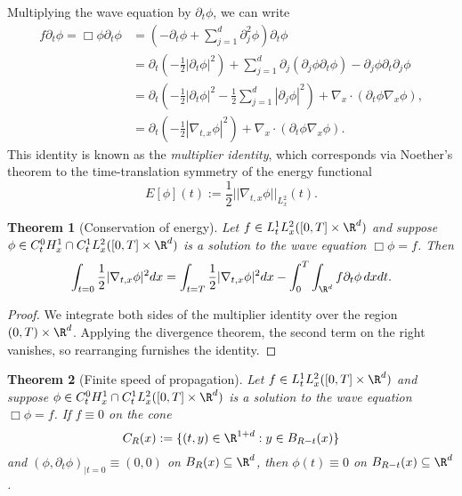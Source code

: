 \documentclass[reqno]{amsart}
\newtheorem{theorem}{Theorem}
\theoremstyle{definition}
\theoremstyle{remark}
\begin{document}
Multiplying the wave equation by $\partial_t \phi$, we can write
\begin{align*}
			f \partial_t \phi = \Box \phi \partial_t \phi
				&= \left( - \partial_t \phi + \sum_{j = 1}^d \partial_j^2 \phi \right) \partial_t \phi \\
				&= \partial_t \left( -\frac12 |\partial_t \phi|^2 \right) + \sum_{j = 1}^d \partial_j (\partial_j \phi \partial_t \phi) - \partial_j \phi \partial_t \partial_j \phi \\
				&= \partial_t \left( -\frac12 |\partial_t \phi|^2 - \frac12 \sum_{j = 1}^d |\partial_j \phi|^2 \right) + \nabla_x \cdot (\partial_t \phi \nabla_x \phi),\\
				&=  \partial_t \left( -\frac12|\nabla_{t, x} \phi|^2\right) + \nabla_x \cdot (\partial_t \phi \nabla_x \phi).
		\end{align*}	
This identity is known as the \textit{multiplier identity}, which corresponds via Noether's theorem to the time-translation symmetry of the energy functional 
	\[ E[\phi](t) := \frac12 ||\nabla_{t, x} \phi||_{L^2_x} (t). \]	

\begin{theorem}[Conservation of energy]
	Let $f \in L^1_t L^2_x ([0, T] \times \R^d)$ and suppose $\phi \in C_t^0 H^1_x \cap C_t^1 L^2_x ([0, T] \times \R^d)$ is a solution to the wave equation $\Box \phi = f$. Then 
		\[ \int_{t = 0} \frac12 |\nabla_{t, x} \phi|^2 dx = \int_{t = T} \frac12 |\nabla_{t, x} \phi|^2 dx - \int_{0}^{T} \int_{\R^d} f \partial_t \phi \, dx dt. \]
\end{theorem}

\begin{proof}
	We integrate both sides of the multiplier identity over the region $(0, T) \times \R^d$. Applying the divergence theorem, the second term on the right vanishes, so rearranging furnishes the identity. 
\end{proof}

\begin{theorem}[Finite speed of propagation]
	Let $f \in L^1_t L^2_x ([0, T] \times \R^d)$ and suppose $\phi \in C^0_t H^1_x \cap C^1_t L^2_x ([0, T] \times \R^d)$ is a solution to the wave equation $\Box \phi = f$. If 	$f \equiv 0$ on the cone 
		\[ C_R (x) := \{ (t, y) \in \R^{1 + d} : y \in B_{R - t} (x) \} \]
	and $(\phi, \partial_t \phi)_{|t = 0} \equiv (0, 0)$ on $B_R (x) \subseteq \R^d$, then $\phi (t) \equiv 0$ on $B_{R - t} (x) \subseteq \R^d$. 
\end{theorem}
\end{document}
